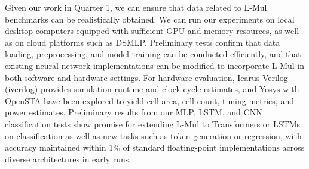 \documentclass[12pt,letterpaper]{article}
\begin{document}
Given our work in Quarter 1, we can ensure that data related to L-Mul benchmarks can be realistically obtained. We can run our experiments on local desktop computers equipped with sufficient GPU and memory resources, as well as on cloud platforms such as DSMLP. Preliminary tests confirm that data loading, preprocessing, and model training can be conducted efficiently, and that existing neural network implementations can be modified to incorporate L-Mul in both software and hardware settings. For hardware evaluation, Icarus Verilog (iverilog) provides simulation runtime and clock-cycle estimates, and Yosys with OpenSTA have been explored to yield cell area, cell count, timing metrics, and power estimates. Preliminary results from our MLP, LSTM, and CNN classification tests show promise for extending L-Mul to Transformers or LSTMs on classification as well as new tasks such as token generation or regression, with accuracy maintained within 1\% of standard floating-point implementations across diverse architectures in early runs.



\end{document}
